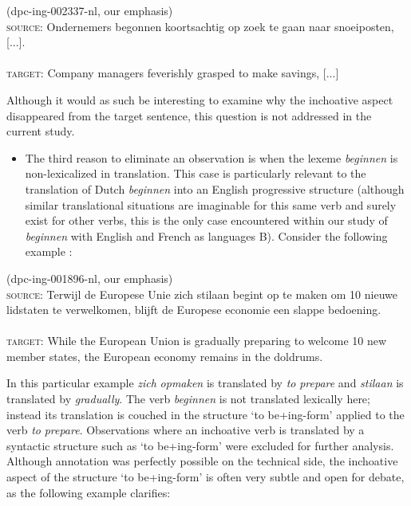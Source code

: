 \ea (dpc-ing-002337-nl, our emphasis)\label{ex:3:2}\\
\textsc{source:} Ondernemers begonnen koortsachtig op zoek te gaan naar snoeiposten, [...].\\\\
\textsc{target:} Company managers feverishly grasped to make savings, [...] 
\z

Although it would as such be interesting to examine why the inchoative aspect disappeared from the target sentence, this question is not addressed in the current study.


\begin{itemize}
\item 
The third reason to eliminate an observation is when the lexeme \textit{beginnen} is non-lexicalized in translation. This case is particularly relevant to the translation of Dutch \textit{beginnen} into an English progressive structure (although similar translational situations are imaginable for this same verb and surely exist for other verbs, this is the only case encountered within our study of \textit{beginnen} with English and French as languages B). Consider the following example :
\end{itemize}

\ea (dpc-ing-001896-nl, our emphasis)\label{ex:3:3}\\
\textsc{source:} Terwijl de Europese Unie zich stilaan begint op te maken om 10 nieuwe lidstaten te verwelkomen, blijft de Europese economie een slappe bedoening.\\\\
\textsc{target:} While the European Union is gradually preparing to welcome 10 new member states, the European economy remains in the doldrums. 
\z

In this particular example \textit{zich} \textit{opmaken} is translated by \textit{to} \textit{prepare} and \textit{stilaan} is translated by \textit{gradually}. The verb \textit{beginnen} is not translated lexically here; instead its translation is couched in the structure ‘to be+ing-form’ applied to the verb \textit{to} \textit{prepare}. Observations where an inchoative verb is translated by a syntactic structure such as `to be+ing-form' were excluded for further analysis. Although annotation was perfectly possible on the technical side, the inchoative aspect of the structure ‘to be+ing-form’ is often very subtle \citep{smith_parameter_1997} and open for debate, as the following example  clarifies:

